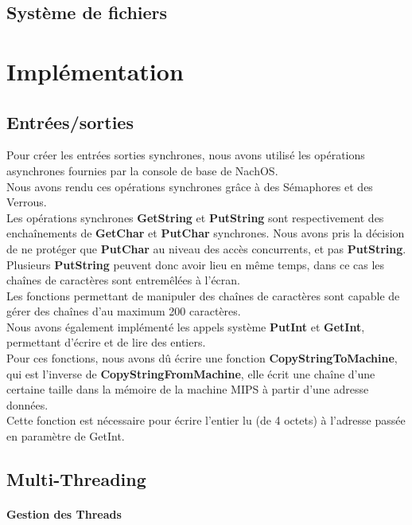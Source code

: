 \documentclass{report}
\newcommand{\myparagraph}[1]{\paragraph*{#1}\mbox{}\\}
\begin{document}
\subsection*{Système de fichiers}



\section*{Implémentation}
\subsection*{Entrées/sorties}

Pour créer les entrées sorties synchrones, nous avons utilisé les opérations asynchrones fournies par la console de base de NachOS.\\
Nous avons rendu ces opérations synchrones grâce à des Sémaphores et des Verrous.\\
Les opérations synchrones \textbf{GetString} et \textbf{PutString} sont respectivement des enchaînements de \textbf{GetChar} et \textbf{PutChar} synchrones.
Nous avons pris la décision de ne protéger que \textbf{PutChar} au niveau des accès concurrents, et pas \textbf{PutString}. Plusieurs \textbf{PutString} peuvent donc avoir lieu en même temps, dans ce cas les chaînes de caractères sont entremêlées à l'écran.\\
Les fonctions permettant de manipuler des chaînes de caractères sont capable de gérer des chaînes d'au maximum 200 caractères.\\

Nous avons également implémenté les appels système \textbf{PutInt} et \textbf{GetInt}, permettant d'écrire et de lire des entiers.\\
Pour ces fonctions, nous avons dû écrire une fonction \textbf{CopyStringToMachine}, qui est l'inverse de \textbf{CopyStringFromMachine}, elle écrit une chaîne d'une certaine taille dans la mémoire de la machine MIPS à partir d'une adresse données.\\
Cette fonction est nécessaire pour écrire l'entier lu (de 4 octets) à l'adresse passée en paramètre de GetInt.
\subsection*{Multi-Threading}
\myparagraph{Gestion des Threads}
\end{document}
